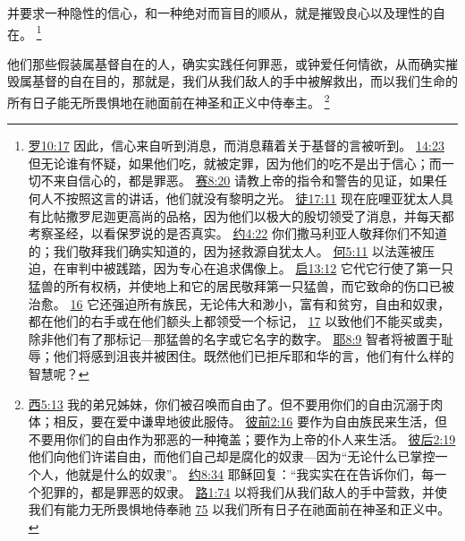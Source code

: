 \documentclass[12pt, a4paper, oneside]{ctexart}
\newcounter{parnum}[section]
\newcommand{\N}{%
   \noindent\refstepcounter{parnum}%
    \makebox[\parindent][l]{\textbf{\arabic{parnum}.}}}
\begin{document}
	并要求一种隐性的信心，和一种绝对而盲目的顺从，就是摧毁良心以及理性的自在。
	\footnote {
		\href{https://biblehub.com/romans/10-17.htm}{罗10:17} 因此，信心来自听到消息，而消息藉着关于基督的言被听到。
		\href{https://biblehub.com/romans/14-23.htm}{14:23} 但无论谁有怀疑，如果他们吃，就被定罪，因为他们的吃不是出于信心；而一切不来自信心的，都是罪恶。
		\href{https://biblehub.com/isaiah/8-20.htm}{赛8:20} 请教上帝的指令和警告的见证，如果任何人不按照这言的讲话，他们就没有黎明之光。
		\href{https://biblehub.com/acts/17-11.htm}{徒17:11} 现在庇哩亚犹太人具有比帖撒罗尼迦更高尚的品格，因为他们以极大的殷切领受了消息，并每天都考察圣经，以看保罗说的是否真实。
		\href{https://biblehub.com/john/4-22.htm}{约4:22} 你们撒马利亚人敬拜你们不知道的；我们敬拜我们确实知道的，因为拯救源自犹太人。
		\href{https://biblehub.com/hosea/5-11.htm}{何5:11} 以法莲被压迫，在审判中被践踏，因为专心在追求偶像上。
		\href{https://biblehub.com/revelation/13-12.htm}{启13:12} 它代它行使了第一只猛兽的所有权柄，并使地上和它的居民敬拜第一只猛兽，而它致命的伤口已被治愈。
		\href{https://biblehub.com/revelation/13-16.htm}{16} 它还强迫所有族民，无论伟大和渺小，富有和贫穷，自由和奴隶，都在他们的右手或在他们额头上都领受一个标记，
		\href{https://biblehub.com/revelation/13-17.htm}{17} 以致他们不能买或卖，除非他们有了那标记---那猛兽的名字或它名字的数字。
		\href{https://biblehub.com/jeremiah/8-9.htm}{耶8:9} 智者将被置于耻辱；他们将感到沮丧并被困住。既然他们已拒斥耶和华的言，他们有什么样的智慧呢？
	}

\N 他们那些假装属基督自在的人，确实实践任何罪恶，或钟爱任何情欲，从而确实摧毁属基督的自在目的，那就是，我们从我们敌人的手中被解救出，而以我们生命的所有日子能无所畏惧地在祂面前在神圣和正义中侍奉主。
	\footnote {
		\href{https://biblehub.com/galatians/5-13.htm}{西5:13} 我的弟兄姊妹，你们被召唤而自由了。但不要用你们的自由沉溺于肉体；相反，要在爱中谦卑地彼此服侍。
		\href{https://biblehub.com/1_peter/2-16.htm}{彼前2:16} 要作为自由族民来生活，但不要用你们的自由作为邪恶的一种掩盖；要作为上帝的仆人来生活。
		\href{https://biblehub.com/2_peter/2-19.htm}{彼后2:19} 他们向他们许诺自由，而他们自己却是腐化的奴隶---因为“无论什么已掌控一个人，他就是什么的奴隶”。
		\href{https://biblehub.com/john/8-34.htm}{约8:34} 耶稣回复：“我实实在在告诉你们，每一个犯罪的，都是罪恶的奴隶。
		\href{https://biblehub.com/luke/1-74.htm}{路1:74} 以将我们从我们敌人的手中营救，并使我们有能力无所畏惧地侍奉祂
		\href{https://biblehub.com/luke/1-75.htm}{75} 以我们所有日子在祂面前在神圣和正义中。
	}
\end{document}
